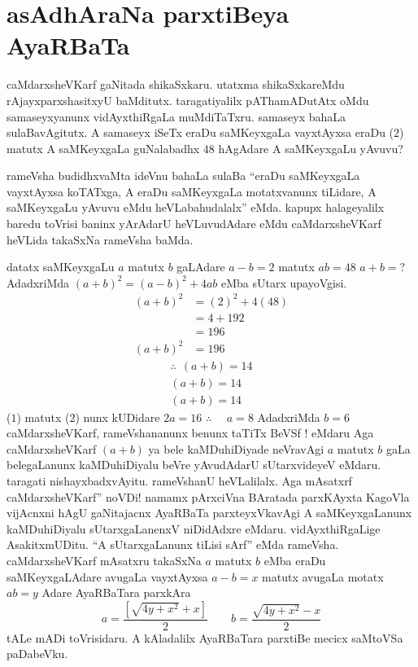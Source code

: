 \chapter{asAdhAraNa parxtiBeya AyaRBaTa}

caMdarxsheVKarf gaNitada shikaSxkaru. utatxma shikaSxkareMdu rAjayxparxshasitxyU baMditutx. taragatiyalilx pAThamADutAtx oMdu samaseyxyanunx vidAyxthiRgaLa muMdiTaTxru. samaseyx bahaLa sulaBavAgitutx. A samaseyx iSeTx eraDu saMKeyxgaLa vayxtAyxsa eraDu ($2$) matutx A saMKeyxgaLa guNalabadhx $48$ hAgAdare A saMKeyxgaLu yAvuvu?

rameVsha budidhxvaMta ideVnu bahaLa sulaBa ``eraDu saMKeyxgaLa vayxtAyxsa koTATxga, A eraDu saMKeyxgaLa motatxvanunx tiLidare, A saMKeyxgaLu yAvuvu eMdu heVLabahudalalx'' eMda. kapupx halageyalilx baredu toVrisi baninx yArAdarU heVLuvudAdare eMdu caMdarxsheVKarf heVLida takaSxNa rameVsha baMda.

datatx saMKeyxgaLu $a$ matutx $b$ gaLAdare $a-b=2$ matutx $ab = 48$ $a+b=?$
AdadxriMda $(a+b)^2 = (a-b)^2 + 4ab$ eMba sUtarx upayoVgisi.
\begin{align*}
  (a+b)^2 & = (2)^2 +4 (48)\\
  & = 4+192\\
  & = 196\\
  (a+b)^2 & = 196   
\end{align*}
\begin{gather*}
  \therefore ~~ (a+b) = 14\\
  (a+b) = 14 \tag{$1$}\\
  (a+b) = 14 \tag{$2$}
\end{gather*}
($1$) matutx ($2$) nunx kUDidare $2a = 16$ $\therefore$~ ~$a=8$  AdadxriMda $b =6$
caMdarxsheVKarf, rameVshananunx benunx taTiTx BeVSf ! eMdaru Aga caMdarxsheVKarf
$(a+b)$ ya bele kaMDuhiDiyade neVravAgi $a$ matutx $b$ gaLa belegaLanunx kaMDuhiDiyalu beVre yAvudAdarU sUtarxvideyeV eMdaru. taragati nishayxbadxvAyitu. rameVshanU heVLalilalx. Aga mAsatxrf caMdarxsheVKarf'' noVDi! namamx pArxciVna BAratada parxKAyxta KagoVla vijAcnxni hAgU gaNitajacnx AyaRBaTa parxteyxVkavAgi A saMKeyxgaLanunx kaMDuhiDiyalu sUtarxgaLanenxV niDidAdxre eMdaru.  vidAyxthiRgaLige AsakitxmUDitu. ``A sUtarxgaLanunx tiLisi sArf'' eMda rameVsha. caMdarxsheVKarf mAsatxru takaSxNa $a$ matutx $b$ eMba eraDu saMKeyxgaLAdare avugaLa vayxtAyxsa $a-b=x$ matutx avugaLa motatx $ab=y$ Adare AyaRBaTara parxkAra
$$
a = \frac{\left[\sqrt{4y+x^2} +x \right]}{2}\qquad  b = \frac{\sqrt{4y+x^2} - x}{2}
$$
tALe mADi toVrisidaru. A kAladalilx AyaRBaTara parxtiBe mecicx saMtoVSa paDabeVku.

